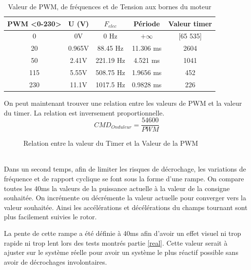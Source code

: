 			\begin{table}[h]
			\centering
			\begin{center}
			\begin{tabular}{|c|c|c|c|c|}
			PWM <0-230> & U (V) & $F_{elec}$ & Période & Valeur timer \\ 
			\hline 
			0 & 0V & 0 Hz & $+\infty$ &  [65 535]\\ 
			20 & 0.965V &  88.45 Hz & 11.306 ms & 2604\\ 
			50 & 2.41V &  221.19 Hz & 4.521 ms & 1041\\ 
			115 & 5.55V & 508.75 Hz & 1.9656 ms & 452\\ 
			230 & 11.1V & 1017.5 Hz & 0.9828 ms & 226\\ 
			\end{tabular} 
			\end{center}
			\caption{Valeur de PWM, de fréquences et de Tension aux bornes du moteur}
			\label{per}
			\end{table}
			On peut maintenant trouver une relation entre les valeurs de PWM et la valeur du timer. La relation est inversement proportionnelle. 
			$$CMD_{Onduleur}=\frac{54600}{PWM}$$
			\begin{figure}[h]
			\centering
				\caption{Relation entre la valeur du Timer et la Valeur de la PWM}
			\end{figure}	\\		
			
			Dans un second temps, afin de limiter les risques de décrochage, les variations de fréquence et de rapport cyclique se font sous la forme d'une rampe. On compare toutes les 40ms la valeurs de la puissance actuelle à la valeur de la consigne souhaitée. On incrémente ou décrémente la valeur actuelle pour converger vers la valeur souhaitée. Ainsi les accélérations et décélérations du champs tournant sont plus facilement suivies le rotor.
			 \begin{tcolorbox}[center,width=0.9\textwidth, colframe=red!90!orange, colback=orange!25, arc=3mm,boxrule=1mm, sharp corners=east,title=Note]
			La pente de cette rampe a été définie à 40ms afin d'avoir un effet visuel ni trop rapide ni trop lent lors des tests montrés partie \ref{real}. Cette valeur serait à ajuster sur le système réelle pour avoir un système le plus réactif possible sans avoir de décrochages involontaires.
  			\end{tcolorbox}

